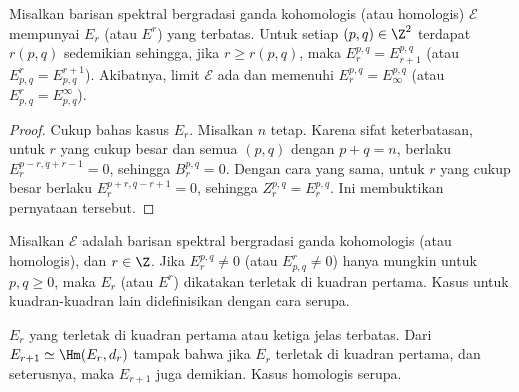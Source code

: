 \begin{proposition}
	Misalkan barisan spektral bergradasi ganda kohomologis (atau homologis)
	$\mathscr{E}$ mempunyai $E_r$ (atau $E^r$) yang terbatas. Untuk setiap
	$(p,q)\in\Z^2$ terdapat $r(p,q)$ sedemikian sehingga, jika
	$r\geq r(p,q)$, maka $E_r^{p,q}=E_{r+1}^{p,q}$ (atau
	$E^r_{p,q}=E^{r+1}_{p,q}$). Akibatnya, limit $\mathscr{E}$ ada dan
	memenuhi $E_r^{p,q}=E_\infty^{p,q}$ (atau
	$E^r_{p,q}=E^\infty_{p,q}$).
\end{proposition}
\begin{proof}
	Cukup bahas kasus $E_r$. Misalkan $n$ tetap. Karena sifat keterbatasan, untuk
	$r$ yang cukup besar dan semua $(p,q)$ dengan $p+q=n$, berlaku
	$E_r^{p-r,q+r-1}=0$, sehingga $B_r^{p,q}=0$. Dengan cara yang sama, untuk
	$r$ yang cukup besar berlaku $E_r^{p+r,q-r+1}=0$, sehingga
	$Z_r^{p,q}=E_r^{p,q}$. Ini membuktikan pernyataan tersebut.
\end{proof}

\begin{definition}\label{def:quadrant-ss}
	Misalkan $\mathscr{E}$ adalah barisan spektral bergradasi ganda kohomologis
	(atau homologis), dan $r\in\Z$. Jika $E_r^{p,q}\neq0$ (atau
	$E^r_{p,q}\neq0$) hanya mungkin untuk $p,q\geq0$, maka $E_r$ (atau $E^r$)
	dikatakan terletak di kuadran pertama. Kasus untuk kuadran-kuadran lain
	didefinisikan dengan cara serupa.
\end{definition}

$E_r$ yang terletak di kuadran pertama atau ketiga jelas terbatas. Dari
$E_{r+1}\simeq\Hm(E_r,d_r)$ tampak bahwa jika $E_r$ terletak di kuadran
pertama, dan seterusnya, maka $E_{r+1}$ juga demikian. Kasus homologis serupa.

